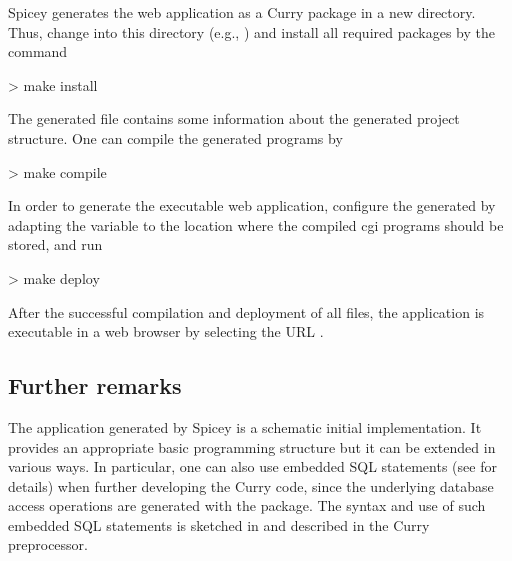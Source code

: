Spicey generates the web application as a Curry package in a new
directory. Thus, change into this directory (e.g., )
and install all required packages by the command
\begin{curry}
> make install
\end{curry}
%
The generated file  contains some information
about the generated project structure.
One can compile the generated programs by
\begin{curry}
> make compile
\end{curry}
In order to generate the executable web application,
configure the generated 
by adapting the variable  to the location
where the compiled cgi programs should be stored, and run
\begin{curry}
> make deploy
\end{curry}
After the successful compilation and deployment of all files,
the application is executable
in a web browser by selecting the URL .


\subsection{Further remarks}

The application generated by Spicey is a schematic initial implementation.
It provides an appropriate basic programming structure but
it can be extended in various ways.
In particular, one can also use embedded SQL statements
(see \cite{HanusKrone17EPTCS} for details)
when further developing the Curry code, since the underlying database
access operations are generated with the  package.
The syntax and use of such embedded SQL statements
is sketched in \cite{HanusKrone17EPTCS} and
described in the Curry preprocessor.
